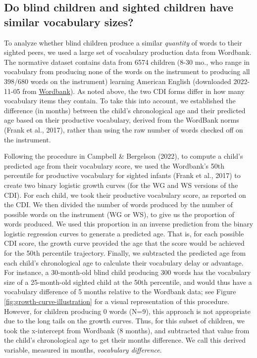 \documentclass[
  man,floatsintext]{apa6}
\begin{document}
\hypertarget{do-blind-children-and-sighted-children-have-similar-vocabulary-sizes}{%
\subsection{Do blind children and sighted children have similar vocabulary sizes?}\label{do-blind-children-and-sighted-children-have-similar-vocabulary-sizes}}

To analyze whether blind children produce a similar \emph{quantity} of words to their sighted peers, we used a large set of vocabulary production data from Wordbank. The normative dataset contains data from 6574 children (8-30 mo., who range in vocabulary from producing none of the words on the instrument to producing all 398/680 words on the instrument) learning American English (downloaded 2022-11-05 from \href{http://wordbank.stanford.edu/data?name=vocab_norms}{Wordbank}). As noted above, the two CDI forms differ in how many vocabulary items they contain. To take this into account, we established the difference (in months) between the child's chronological age and their predicted age based on their productive vocabulary, derived from the WordBank norms (Frank et al., 2017), rather than using the raw number of words checked off on the instrument.

Following the procedure in Campbell \& Bergelson (2022), to compute a child's predicted age from their vocabulary score, we used the Wordbank's 50th percentile for productive vocabulary for sighted infants (Frank et al., 2017) to create two binary logistic growth curves (for the WG and WS versions of the CDI). For each child, we took their productive vocabulary score, as reported on the CDI. We then divided the number of words produced by the number of possible words on the instrument (WG or WS), to give us the proportion of words produced. We used this proportion in an inverse prediction from the binary logistic regression curves to generate a predicted age. That is, for each possible CDI score, the growth curve provided the age that the score would be achieved for the 50th percentile trajectory. Finally, we subtracted the predicted age from each child's chronological age to calculate their vocabulary delay or advantage. For instance, a 30-month-old blind child producing 300 words has the vocabulary size of a 25-month-old sighted child at the 50th percentile, and would thus have a vocabulary difference of 5 months relative to the Wordbank data; see Figure \ref{fig:growth-curve-illustration} for a visual representation of this procedure. However, for children producing 0 words (N=9), this approach is not appropriate due to the long tails on the growth curves. Thus, for this subset of children, we took the x-intercept from Wordbank (8 months), and subtracted that value from the child's chronological age to get their months difference. We call this derived variable, measured in months, \emph{vocabulary difference}.
\end{document}
